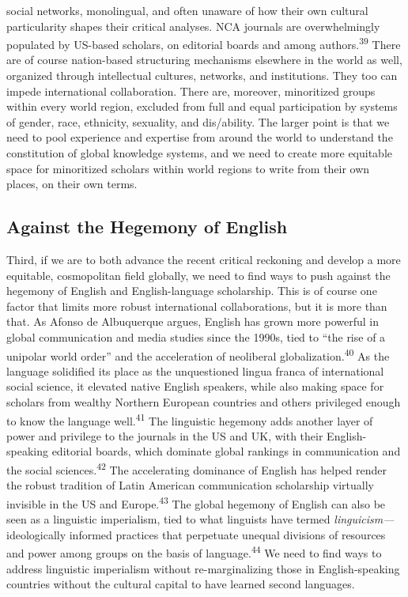 \documentclass{tufte-handout}
\begin{document}
social networks, monolingual, and often unaware of how their own
cultural particularity shapes their critical analyses. NCA journals are
overwhelmingly populated by US-based scholars, on editorial boards and
among authors.\textsuperscript{39} There are of course
nation-based structuring mechanisms elsewhere in the world as well,
organized through intellectual cultures, networks, and institutions.
They too can impede international collaboration. There are, moreover,
minoritized groups within every world region, excluded from full and
equal participation by systems of gender, race, ethnicity, sexuality,
and dis/ability. The larger point is that we need to pool experience and
expertise from around the world to understand the constitution of global
knowledge systems, and we need to create more equitable space for
minoritized scholars within world regions to write from their own
places, on their own terms.

\hypertarget{against-the-hegemony-of-english}{%
\subsection{Against the Hegemony of
English}\label{against-the-hegemony-of-english}}

Third, if we are to both advance the recent critical reckoning and
develop a more equitable, cosmopolitan field globally, we need to find
ways to push against the hegemony of English and English-language
scholarship. This is of course one factor that limits more robust
international collaborations, but it is more than that. As Afonso de
Albuquerque argues, English has grown more powerful in global
communication and media studies since the 1990s, tied to ``the rise of a
unipolar world order'' and the acceleration of neoliberal
globalization.\textsuperscript{40} As the language solidified its
place as the unquestioned lingua franca of international social science,
it elevated native English speakers, while also making space for
scholars from wealthy Northern European countries and others privileged
enough to know the language well.\textsuperscript{41} The
linguistic hegemony adds another layer of power and privilege to the
journals in the US and UK, with their English-speaking editorial boards,
which dominate global rankings in communication and the social
sciences.\textsuperscript{42} The
accelerating dominance of English has helped render the robust tradition
of Latin American communication scholarship virtually invisible in the
US and Europe.\textsuperscript{43} The global hegemony of English can also be seen as a
linguistic imperialism, tied to what linguists have termed
\emph{linguicism---}ideologically informed practices that perpetuate
unequal divisions of resources and power among groups on the basis of
language.\textsuperscript{44} We need to find ways to
address linguistic imperialism without re-marginalizing those in
English-speaking countries without the cultural capital to have learned
second languages.
\end{document}
